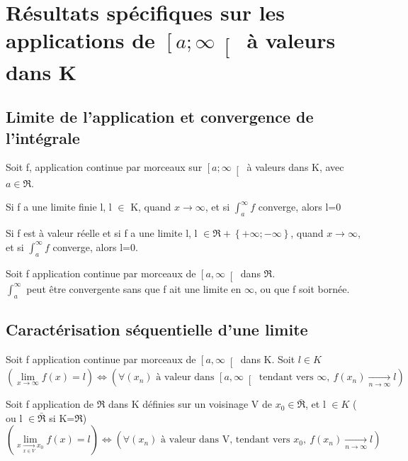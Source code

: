 \section{Résultats spécifiques sur les applications de $\left[a;\infty\right[$ à valeurs dans K}
\subsection{Limite de l'application et convergence de l'intégrale}
Soit f, application continue par morceaux sur $\left[a;\infty\right[$ à valeurs dans K, avec $a \in \Re$.
\begin{prop}
Si f a une limite finie l, l $\in$ K, quand $x \rightarrow \infty$, et si $\int_a^{\infty} f$ converge, alors l=0
\end{prop}
\begin{prop}
Si f est à valeur réelle et si f a une limite l, l $\in \Re+\left\lbrace+\infty;-\infty\right\rbrace $, quand $x \rightarrow \infty$, et si $\int_a^{\infty} f$ converge, alors l=0.
\end{prop}
\begin{prop}
Soit f application continue par morceaux de $\left[a,\infty\right[$ dans $\Re$.\\
$\int_a^{\infty}$ peut être convergente sans que f ait une limite en $\infty$, ou que f soit bornée.
\end{prop}
\subsection{Caractérisation séquentielle d'une limite}
\begin{prop}
Soit f application continue par morceaux de $\left[a,\infty\right[$ dans K. Soit $l \in K$
$$(\lim_{x \rightarrow \infty } f(x) = l) \Leftrightarrow (\forall (x_n) \mbox{ à valeur dans } \left[a,\infty\right[ \mbox{ tendant vers }\infty, ~ f(x_n) \underset{n\rightarrow\infty}\rightarrow l)$$
\end{prop}
\begin{prop}
Soit f application de $\Re$ dans K définies sur un voisinage V de $x_0 \in \bar{\Re}$, et l $\in K$ ( ou l $\in \bar{\Re}$ si K=$\Re$)
$$(\lim_{x \underset{x \in V}\rightarrow x_0 } f(x) = l) \Leftrightarrow (\forall (x_n) \mbox{ à valeur dans V, tendant vers }x_0, ~ f(x_n) \underset{n\rightarrow\infty}\rightarrow l)$$
\end{prop}
